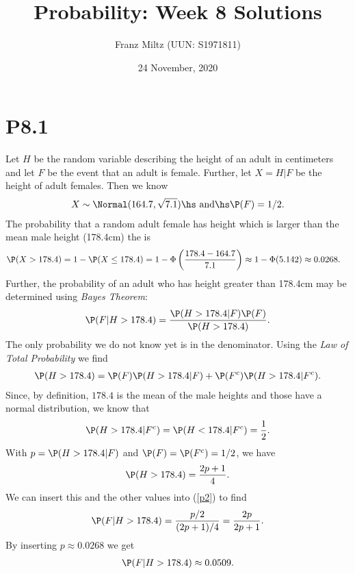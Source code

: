 \documentclass{article}
\begin{document}
\title{Probability: Week 8 Solutions}
\author{Franz Miltz (UUN: S1971811)}
\date{24 November, 2020}
\maketitle

\section*{P8.1}

Let $H$ be the random variable describing the height of an adult in centimeters
and let $F$ be the event that an adult is female. Further, let $X=H|F$ be the
height of adult females. Then we know
\begin{align*}
  X \sim \Normal(164.7, \sqrt{7.1})
  \text{\hs and\hs}
  \P(F) = 1/2.
\end{align*}
The probability that a random adult female has height which is larger than
the mean male height (178.4cm) the is
\begin{align*}
  \P(X>178.4) & = 1 - \P(X \leq 178.4) = 1 - \Phi\left(\frac{178.4-164.7}{7.1}\right)
  \approx 1-\Phi(5.142) \approx 0.0268.
\end{align*}
Further, the probability of an adult who has height greater than 178.4cm
may be determined using \emph{Bayes Theorem}:
\begin{align}
  \label{p2}
  \P(F|H>178.4) = \frac{\P(H>178.4|F)\P(F)}{\P(H>178.4)}.
\end{align}
The only probability we do not know yet is in the denominator. Using the
\emph{Law of Total Probability} we find
\begin{align*}
  \P(H>178.4) = \P(F)\P(H>178.4|F) + \P(F^c)\P(H>178.4|F^c).
\end{align*}
Since, by definition, $178.4$ is the mean of the male heights and those
have a normal distribution, we know that
\begin{align*}
  \P(H>178.4|F^c) = \P(H<178.4|F^c)=\frac{1}{2}.
\end{align*}
With $p=\P(H>178.4|F)$ and $\P(F)=\P(F^c)=1/2$, we have
\begin{align*}
  \P(H>178.4) = \frac{2p+1}{4}.
\end{align*}
We can insert this and the other values into (\ref{p2}) to find
\begin{align*}
  \P(F|H>178.4)=\frac{p/2}{(2p+1)/4}=\frac{2p}{2p+1}.
\end{align*}
By inserting $p\approx 0.0268$ we get
\begin{align*}
  \P(F|H>178.4)\approx 0.0509.
\end{align*}
\end{document}

